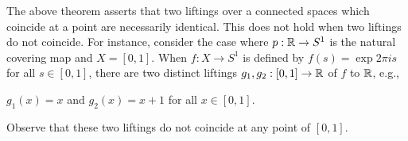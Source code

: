 \begin{exmp}
    The above theorem asserts that two liftings over a connected spaces which coincide at a point are necessarily identical.
    This does not hold when two liftings do not coincide.
    For instance, consider the case where $p: {\mathbb{R}}\rightarrow S^1$ is the natural covering map and $X=[0, 1]$.
    When $f: X\rightarrow S^1$ is defined by $f(s)=\exp{2\pi i s}$ for all $s\in [0, 1]$, there are two distinct liftings $g_1, g_2: [0, 1]\rightarrow{\mathbb{R}}$ of $f$ to ${\mathbb{R}}$, e.g.,
    \begin{center}
        $g_1(x)=x$ and $g_2(x)=x+1$ for all $x\in[0, 1]$.
    \end{center}
    Observe that these two liftings do not coincide at any point of $[0, 1]$.
\end{exmp}

